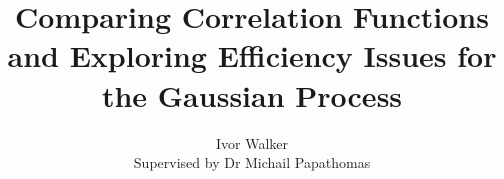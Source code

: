 \documentclass[10pt]{article}
\begin{document}
\title{Comparing Correlation Functions and Exploring Efficiency Issues for the Gaussian Process}
\author{
    Ivor Walker \\
    Supervised by Dr Michail Papathomas \\
}
\date{ }
\maketitle



\newpage
\tableofcontents
\newpage











% 



\printbibliography
\end{document}
